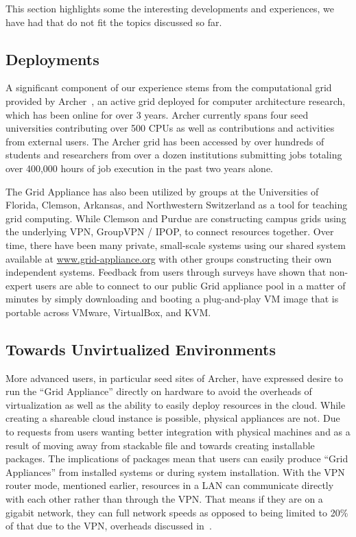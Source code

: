 \documentclass[conference]{IEEEtran}
\begin{document}
This section highlights some the interesting developments and experiences, we
have had that do not fit the topics discussed so far.  

\subsection{Deployments}

A significant component of our experience stems from the computational grid
provided by Archer~\cite{archer}, an active grid deployed for computer
architecture research, which has been online for over 3 years.  Archer
currently spans four seed universities contributing over 500 CPUs as well as
contributions and activities from external users.  The Archer grid has been
accessed by over hundreds of students and researchers from over a dozen
institutions submitting jobs totaling over 400,000 hours of job execution in
the past two years alone.

The Grid Appliance has also been utilized by groups at the Universities of
Florida, Clemson, Arkansas, and Northwestern Switzerland as a tool for teaching
grid computing.  While Clemson and Purdue are constructing campus grids using
the underlying VPN, GroupVPN / IPOP, to connect resources together.  Over time,
there have been many private, small-scale systems using our shared system
available at \url{www.grid-appliance.org} with other groups constructing their
own independent systems.  Feedback from users through surveys have shown that
non-expert users are able to connect to our public Grid appliance pool in a
matter of minutes by simply downloading and booting a plug-and-play VM image
that is portable across VMware, VirtualBox, and KVM.

\subsection{Towards Unvirtualized Environments}
\label{packaging}

More advanced users, in particular seed sites of Archer, have expressed desire
to run the ``Grid Appliance'' directly on hardware to avoid the overheads of
virtualization as well as the ability to easily deploy resources in the cloud.
While creating a shareable cloud instance is possible, physical appliances are
not.  Due to requests from users wanting better integration with physical
machines and as a result of moving away from stackable file and towards
creating installable packages.  The implications of packages mean that users
can easily produce ``Grid Appliances'' from installed systems or during system
installation.  With the VPN router mode, mentioned earlier, resources in a LAN
can communicate directly with each other rather than through the VPN.  That
means if they are on a gigabit network, they can full network speeds as opposed
to being limited to 20\% of that due to the VPN, overheads discussed
in~\cite{sc09}.
\end{document}

